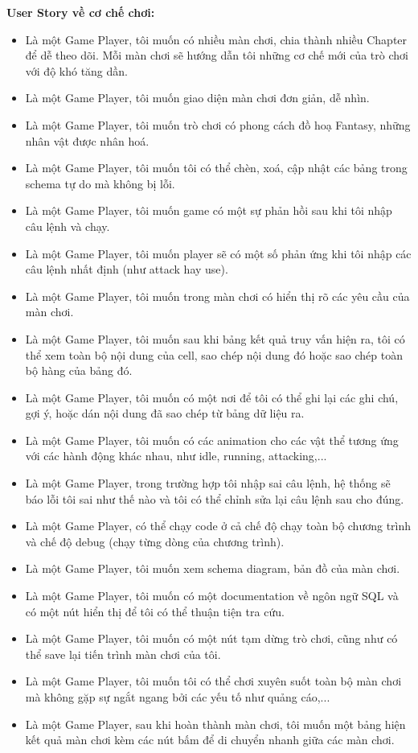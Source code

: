 \textbf{User Story về cơ chế chơi:}
\begin{itemize}
	\item Là một Game Player, tôi muốn có nhiều màn chơi, chia thành nhiều Chapter để dễ theo dõi. Mỗi màn chơi sẽ hướng dẫn tôi những cơ chế mới của trò chơi với độ khó tăng dần.
	\item Là một Game Player, tôi muốn giao diện màn chơi đơn giản, dễ nhìn.
	\item Là một Game Player, tôi muốn trò chơi có phong cách đồ hoạ Fantasy, những nhân vật được nhân hoá.
	\item Là một Game Player, tôi muốn tôi có thể chèn, xoá, cập nhật các bảng trong schema tự do mà không bị lỗi.
	\item Là một Game Player, tôi muốn game có một sự phản hồi sau khi tôi nhập câu lệnh và chạy.
	\item Là một Game Player, tôi muốn player sẽ có một số phản ứng khi tôi nhập các câu lệnh nhất định (như attack hay use).
	\item Là một Game Player, tôi muốn trong màn chơi có hiển thị rõ các yêu cầu của màn chơi.
	\item Là một Game Player, tôi muốn sau khi bảng kết quả truy vấn hiện ra, tôi có thể xem toàn bộ nội dung của cell, sao chép nội dung đó hoặc sao chép toàn bộ hàng của bảng đó.
	\item Là một Game Player, tôi muốn có một nơi để tôi có thể ghi lại các ghi chú, gợi ý, hoặc dán nội dung đã sao chép từ bảng dữ liệu ra.
	\item Là một Game Player, tôi muốn có các animation cho các vật thể tương ứng với các hành động khác nhau, như idle, running, attacking,...
	\item Là một Game Player, trong trường hợp tôi nhập sai câu lệnh, hệ thống sẽ báo lỗi tôi sai như thế nào và tôi có thể chỉnh sửa lại câu lệnh sau cho đúng. 
	\item Là một Game Player, có thể chạy code ở cả chế độ chạy toàn bộ chương trình và chế độ debug (chạy từng dòng của chương trình).
	\item Là một Game Player, tôi muốn xem schema diagram, bản đồ của màn chơi.
	\item Là một Game Player, tôi muốn có một documentation về ngôn ngữ SQL và có một nút hiển thị để tôi có thể thuận tiện tra cứu.
	\item Là một Game Player, tôi muốn có một nút tạm dừng trò chơi, cũng như có thể save lại tiến trình màn chơi của tôi.
	\item Là một Game Player, tôi muốn tôi có thể chơi xuyên suốt toàn bộ màn chơi mà không gặp sự ngắt ngang bởi các yếu tố như quảng cáo,...
	\item Là một Game Player, sau khi hoàn thành màn chơi, tôi muốn một bảng hiện kết quả màn chơi kèm các nút bấm để di chuyển nhanh giữa các màn chơi.
\end{itemize}



